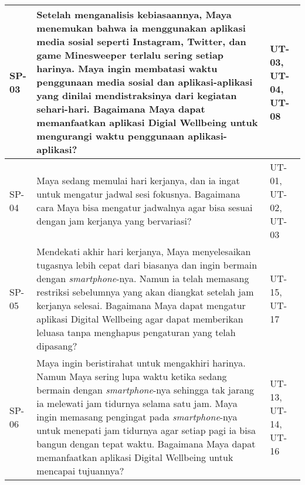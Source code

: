 \begin{small}
\begin{longtable}[c]{|W{c}{0.07\textwidth}|>{\ccnormspacing}m{0.65\textwidth}|>{\ccnormspacingcenter}m{0.19\textwidth}|}
  SP-03 & Setelah menganalisis kebiasaannya, Maya menemukan bahwa ia menggunakan aplikasi media sosial seperti Instagram, Twitter, dan game Minesweeper terlalu sering setiap harinya. Maya ingin membatasi waktu penggunaan media sosial dan aplikasi-aplikasi yang dinilai mendistraksinya dari kegiatan sehari-hari. Bagaimana Maya dapat memanfaatkan aplikasi Digial Wellbeing untuk mengurangi waktu penggunaan aplikasi-aplikasi? & UT-03, UT-04, UT-08 \\ \hline

  SP-04  & Maya sedang memulai hari kerjanya, dan ia ingat untuk mengatur jadwal sesi fokusnya. Bagaimana cara Maya bisa mengatur jadwalnya agar bisa sesuai dengan jam kerjanya yang bervariasi? & UT-01, UT-02, UT-03 \\ \hline
  
  SP-05  & Mendekati akhir hari kerjanya, Maya menyelesaikan tugasnya lebih cepat dari biasanya dan ingin bermain dengan \textit{smartphone}-nya. Namun ia telah memasang restriksi sebelumnya yang akan diangkat setelah jam kerjanya selesai. Bagaimana Maya dapat mengatur aplikasi Digital Wellbeing agar dapat memberikan leluasa tanpa menghapus pengaturan yang telah dipasang? & UT-15, UT-17 \\ \hline
  
  SP-06  & Maya ingin beristirahat untuk mengakhiri harinya. Namun Maya sering lupa waktu ketika sedang bermain dengan \textit{smartphone}-nya sehingga tak jarang ia melewati jam tidurnya selama satu jam. Maya ingin memasang pengingat pada \textit{smartphone}-nya untuk menepati jam tidurnya agar setiap pagi ia bisa bangun dengan tepat waktu. Bagaimana Maya dapat memanfaatkan aplikasi Digital Wellbeing untuk mencapai tujuannya? & UT-13, UT-14, UT-16 \\ \hline
\end{longtable}
\end{small}
\justifying
\FloatBarrier
